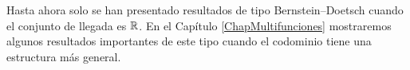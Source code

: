 Hasta ahora solo se han presentado resultados de tipo Bernstein--Doetsch
cuando el conjunto de llegada es $\mathbb{R}$. En el Capítulo 
\ref{ChapMultifunciones} mostraremos algunos resultados importantes
de este tipo cuando el codominio tiene una estructura más general.






